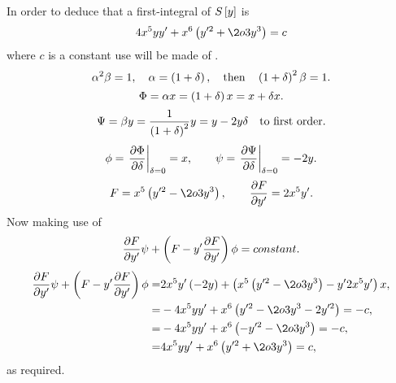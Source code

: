 \def\a2b{\alpha^2\beta}
In order to deduce that a first-integral of $S\left[{y}\right]$ is
\[
	4x^5y y^\prime + x^6\lr{y^{\prime2} + \2o3 y^3} = c
\]
where $c$ is a constant use will be made of \nt.
\[
	\a2b = 1,\quad \alpha=\lr{1+\delta},\quad \textrm{then}\quad \lr{1+\delta}^2\beta=1.
\]
\[
	\Phi = \alpha x = \left(1+\delta\right) x = x + \delta x.
\]
\[
	\Psi = \beta y = \frac{1}{\left(1+\delta\right)^2}y = y-2y\delta\quad \textrm{to first order}.
\]
\[
	\phi =\left. \frac{\partial \Phi}{\partial \delta} \right| _{\delta=0} = x,\qquad \psi = \left. \frac{\partial \Psi}{\partial \delta} \right| _{\delta=0} = -2y.
\]
\[
	F = x^5\lr{y^{\prime2} - \2o3 y^3},\qquad \pderiv{F}{y^\prime} = 2x^5 y^\prime.
\]
Now making use of \nt{}
\[
	\frac{\partial F}{\partial y^\prime}\psi + \left(F - y^\prime \frac{\partial F}{\partial y^\prime}\right)\phi = constant.
\]
\begin{align*}
	\pderiv{F}{y^\prime}\psi + \lr{F - y^\prime \pderiv{F}{y^\prime}}\phi =& 2x^5 y^\prime\lr{-2y} + \lr{ x^5\lr{y^{\prime2} - \2o3 y^3} - y^\prime 2x^5 y^\prime}x,\\
	=& -4 x^5yy^\prime + x^6\lr{y^{\prime2}-\2o3 y^3 - 2y^{\prime2}} = -c,\\
	=& -4 x^5yy^\prime + x^6\lr{-y^{\prime2}-\2o3 y^3} = -c,\\
	=& 4 x^5yy^\prime + x^6\lr{y^{\prime2}+\2o3 y^3} = c,\\
\end{align*}
as required.